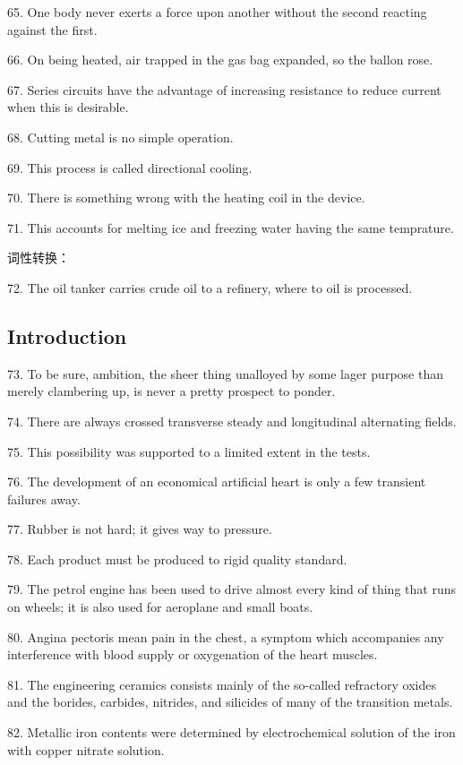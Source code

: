 \documentclass[a4paper,twocolumn,10pt]{article}
\begin{document}
\begin{CJK}{UTF8}{gkai}
65. One body never exerts a force upon another without the second
reacting against the first.

66. On being heated, air trapped in the gas bag expanded, so the ballon rose.

67. Series circuits have the advantage of increasing resistance to reduce
current when this is desirable.

68. Cutting metal is no simple operation.

69. This process is called directional cooling.

70. There is something wrong with the heating coil in the device.

71. This accounts for melting ice and freezing water having the same
temprature.

词性转换：

72. The oil tanker carries crude oil to a refinery, where to oil
is processed.

\subsection{Introduction}

73. To be sure, ambition, the sheer thing unalloyed by some lager purpose than merely
clambering up, is never a pretty prospect to ponder.

74. There are always crossed transverse steady and longitudinal alternating fields.

75. This possibility was supported to a limited extent in the tests.

76. The development of an economical artificial heart is only a few transient failures away.

77. Rubber is not hard; it gives way to pressure.

78. Each product must be produced to rigid quality standard.

79. The petrol engine has been used to drive almost every kind of thing
that runs on wheels; it is also used for aeroplane and small boats.

80. Angina pectoris mean pain in the chest, a symptom which accompanies
any interference with blood supply or oxygenation of the heart muscles.

81. The engineering ceramics consists mainly of the so-called refractory
oxides and the borides, carbides, nitrides, and silicides of many of
the transition metals.

82. Metallic iron contents were determined by electrochemical solution of the
iron with copper nitrate solution.


\end{CJK}
\end{document}
